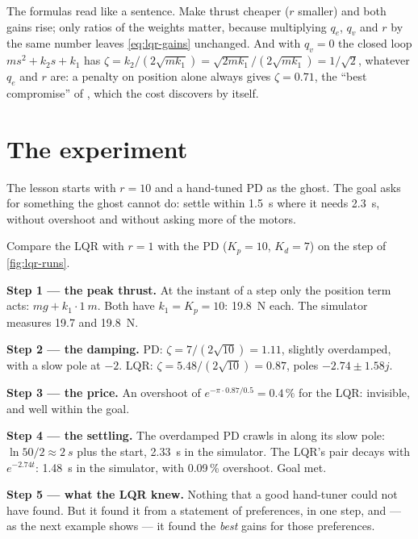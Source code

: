The formulas read like a sentence. Make thrust cheaper ($r$ smaller) and both gains rise; only ratios of the weights matter, because multiplying $q_e$, $q_v$ and $r$ by the same number leaves \cref{eq:lqr-gains} unchanged. And with $q_v = 0$ the closed loop $ms^2 + k_2s + k_1$ has $\zeta = k_2/(2\sqrt{mk_1}) = \sqrt{2mk_1}/(2\sqrt{mk_1}) = 1/\sqrt2$, whatever $q_e$ and $r$ are: a penalty on position alone always gives $\zeta = 0.71$, the \enquote{best compromise} of , which the cost discovers by itself.

\section{The experiment}

The lesson starts with $r = 10$ and a hand-tuned PD as the ghost. The goal asks for something the ghost cannot do: settle within \SI{1.5}{s} where it needs \SI{2.3}{s}, without overshoot and without asking more of the motors.


\begin{example}[Why $r = 1$ beats the ghost]
\label{ex:lqr-goal}
Compare the LQR with $r = 1$ with the PD ($K_p = 10$, $K_d = 7$) on the step of \cref{fig:lqr-runs}.

\textbf{Step 1 — the peak thrust.} At the instant of a step only the position term acts: $mg + k_1 \cdot \SI{1}{m}$. Both have $k_1 = K_p = 10$: \SI{19.8}{N} each. The simulator measures 19.7 and \SI{19.8}{N}.

\textbf{Step 2 — the damping.} PD: $\zeta = 7/(2\sqrt{10}) = 1.11$, slightly overdamped, with a slow pole at $-2$. LQR: $\zeta = 5.48/(2\sqrt{10}) = 0.87$, poles $-2.74 \pm 1.58j$.

\textbf{Step 3 — the price.} An overshoot of $e^{-\pi \cdot 0.87/0.5} = 0.4\,\%$ for the LQR: invisible, and well within the goal.

\textbf{Step 4 — the settling.} The overdamped PD crawls in along its slow pole: $\ln 50/2 \approx \SI{2}{s}$ plus the start, \SI{2.33}{s} in the simulator. The LQR's pair decays with $e^{-2.74t}$: \SI{1.48}{s} in the simulator, with 0.09\,\% overshoot. Goal met.

\textbf{Step 5 — what the LQR knew.} Nothing that a good hand-tuner could not have found. But it found it from a statement of preferences, in one step, and — as the next example shows — it found the \emph{best} gains for those preferences.
\end{example}

